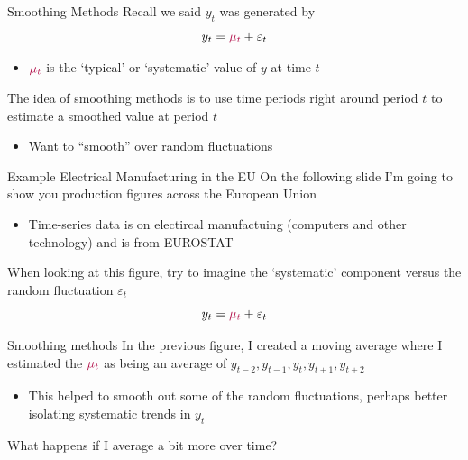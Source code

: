 \documentclass[aspectratio=169,t,11pt,table]{beamer}
\begin{document}
\begin{frame}{Smoothing Methods}
  Recall we said $y_t$ was generated by 
  $$
    y_t = {\color[HTML]{B3114B} \mu_t} + \varepsilon_t
  $$
  \begin{itemize}
    \item ${\color[HTML]{B3114B} \mu_t}$ is the `typical' or `systematic' value of $y$ at time $t$
  \end{itemize}

  \bigskip
  The idea of \alert{smoothing methods} is to use time periods right around period $t$ to estimate a smoothed value at period $t$
  \begin{itemize}
    \item Want to ``smooth'' over random fluctuations 
  \end{itemize}
\end{frame}

\begin{frame}{Example Electrical Manufacturing in the EU}
  On the following slide I'm going to show you production figures across the European Union
  \begin{itemize}
    \item Time-series data is on electircal manufactuing (computers and other technology) and is from EUROSTAT 
  \end{itemize}

  \bigskip
  When looking at this figure, try to imagine the `systematic' component versus the random fluctuation $\varepsilon_t$
  $$
    y_t = {\color[HTML]{B3114B} \mu_t} + \varepsilon_t
  $$
\end{frame}


\begin{frame}{Smoothing methods}
  In the previous figure, I created a \alert{moving average} where I estimated the ${\color[HTML]{B3114B} \mu_t}$ as being an average of $y_{t-2}, y_{t-1}, y_{t}, y_{t+1}, y_{t+2}$

  \begin{itemize}
    \item This helped to smooth out some of the random fluctuations, perhaps better isolating systematic trends in $y_t$
  \end{itemize}

  \bigskip
  \pause
  What happens if I average a bit more over time?
\end{frame}
\end{document}
